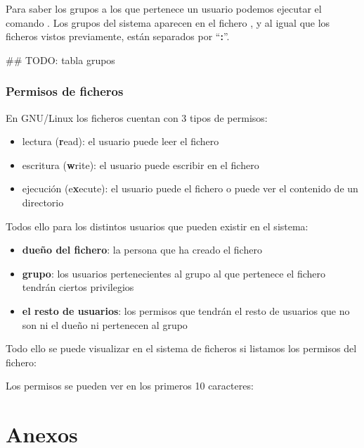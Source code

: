 \documentclass{../../../yukibook.cls/yukibook}
\begin{document}
Para saber los grupos a los que pertenece un usuario podemos ejecutar el comando . Los grupos del sistema aparecen en el fichero , y al igual que los ficheros vistos previamente, están separados por “\textbf{:}”.

\#\# TODO: tabla grupos


\section{Permisos de ficheros}
En GNU/Linux los ficheros cuentan con 3 tipos de permisos:
\begin{itemize}
    \item lectura (\textbf{r}ead): el usuario puede leer el fichero
    \item escritura (\textbf{w}rite): el usuario puede escribir en el fichero
    \item ejecución (e\textbf{x}ecute): el usuario puede el fichero o puede ver el contenido de un directorio
\end{itemize}


Todos ello para los distintos usuarios que pueden existir en el sistema:
\begin{itemize}
    \item \textbf{dueño del fichero}: la persona que ha creado el fichero
    \item \textbf{grupo}: los usuarios pertenecientes al grupo al que pertenece el fichero tendrán ciertos privilegios
    \item \textbf{el resto de usuarios}: los permisos que tendrán el resto de usuarios que no son ni el dueño ni pertenecen al grupo
\end{itemize}

Todo ello se puede visualizar en el sistema de ficheros si listamos los permisos del fichero:


Los permisos se pueden ver en los primeros 10 caracteres:


\part{Anexos}

\graphicspath{{../../../anexos/instalar_ubuntu_lts/}}


\graphicspath{{../../../anexos/ubuntu_raid1/}}


\graphicspath{{../../../anexos/monitorizacion_munin/}}


\graphicspath{{../../../anexos/}}

\end{document}
